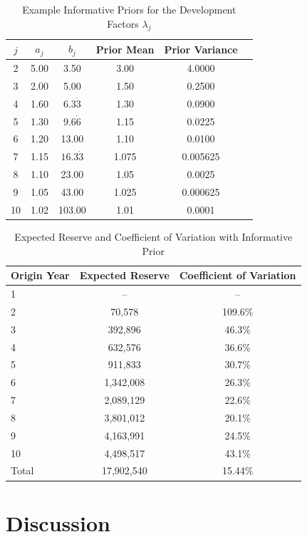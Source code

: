 \documentclass[aps,pre,draft]{revtex4-2}
\begin{document}
\begin{table}[htbp]
\centering
\caption{Example Informative Priors for the Development Factors $\lambda_j$}
\label{tab:informative}
\begin{tabular}{cccccc}
\toprule
$j$ & $a_j$ & $b_j$ & Prior Mean & Prior Variance \\
\midrule
2  & 5.00  & 3.50  & 3.00  & 4.0000 \\
3  & 2.00  & 5.00  & 1.50  & 0.2500 \\
4  & 1.60  & $6.3\dot{3}$  & 1.30  & 0.0900 \\
5  & 1.30  & $9.6\dot{6}$  & 1.15  & 0.0225 \\
6  & 1.20  & 13.00 & 1.10  & 0.0100 \\
7  & 1.15  & $16.3\dot{3}$ & 1.075  & 0.005625 \\
8  & 1.10  & 23.00 & 1.05  & 0.0025 \\
9  & 1.05  & 43.00 & 1.025  & 0.000625 \\
10 & 1.02  & 103.00& 1.01  & 0.0001 \\
\bottomrule
\end{tabular}
\end{table}

\begin{table}[htbp]
\centering
\caption{Expected Reserve and Coefficient of Variation with Informative Prior}
\label{tab:informative_results}
\begin{tabular}{lcc}
\toprule
Origin Year & Expected Reserve & Coefficient of Variation \\
\midrule
1  & --        & --      \\
2  & 70,578    & 109.6\% \\
3  & 392,896   & 46.3\%  \\
4  & 632,576   & 36.6\%  \\
5  & 911,833   & 30.7\%  \\
6  & 1,342,008 & 26.3\%  \\
7  & 2,089,129 & 22.6\%  \\
8  & 3,801,012 & 20.1\%  \\
9  & 4,163,991 & 24.5\%  \\
10 & 4,498,517 & 43.1\%  \\
\midrule
Total & 17,902,540 & 15.44\% \\
\bottomrule
\end{tabular}%
\end{table}

\section{Discussion}
\end{document}
